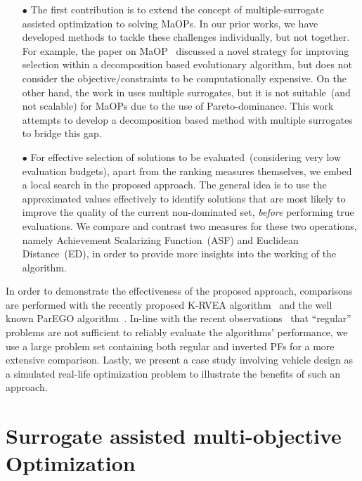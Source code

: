 \begin{itemize}
	
	\item[$\bullet$] The first contribution is to extend the concept of multiple-surrogate assisted optimization {\color{blue}to solving MaOPs}. In our prior works, we have developed methods to tackle these challenges individually, but not together. For example, the paper on MaOP~\cite{KHTjmd2017} discussed a novel strategy for improving selection within a decomposition based evolutionary algorithm, but does not consider the objective/constraints to be computationally expensive. On the other hand, the work in \cite{KHTjmd2016,bhattacharjee2016multiple} uses multiple surrogates, {\color{blue}but it is not} suitable~(and not scalable) for MaOPs due to the use of Pareto-dominance. This work attempts to develop a decomposition based method with multiple surrogates to bridge this gap. 
	
	\item[$\bullet$]  For effective selection of solutions to be evaluated~(considering very low evaluation budgets), apart from the ranking measures themselves, we embed a local search in the proposed approach. {\color{blue}The general idea is to use the approximated values effectively to identify solutions that are most likely to improve the quality of the current non-dominated set, \emph{before} performing true evaluations.} We compare and contrast two measures for these two operations, namely Achievement Scalarizing Function~(ASF) and Euclidean Distance~(ED), in order to provide more insights into the working of the algorithm. 
	
	
\end{itemize}

{\color{blue}
	In order to demonstrate the effectiveness of the proposed approach, comparisons are performed with the recently proposed K-RVEA algorithm~\cite{KHTchugh2016krvea,KHTchugh2016const} and the well known ParEGO algorithm~\cite{KHTknowles2006pha}. In-line with the recent observations~\cite{asaf2017enhanced,KHTishibuchi2016inverse} that ``regular'' problems are not sufficient to reliably evaluate the algorithms' performance, we use a large problem set containing both regular and inverted PFs for a more extensive comparison. Lastly, we present a case study involving {\color{blue}vehicle design} as a simulated real-life optimization problem to illustrate the benefits of such an approach. 
}


\section{Surrogate assisted multi-objective Optimization}
\label{sec:KHTsec:3}

